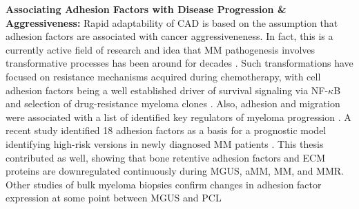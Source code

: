 










\textbf{Associating Adhesion Factors with Disease Progression \& Aggressiveness:}
Rapid adaptability of \ac{CAD} is based on the assumption that adhesion factors
are associated with cancer aggressiveneness. In fact, this is a currently active
field of research and idea that MM pathogenesis involves transformative
processes has been around for decades
\cite{hallekMultipleMyelomaIncreasing1998}. Such transformations have focused on
resistance mechanisms acquired during chemotherapy, with cell adhesion factors
being a well established driver of survival signaling via NF-$\kappa$B and
selection of drug-resistance myeloma clones
\cite{landowskiCellAdhesionmediatedDrug2003,
      solimandoDrugResistanceMultiple2022}. Also, adhesion and migration were
associated with a list of identified key regulators of myeloma
progression%
\cite{shenProgressionSignatureUnderlies2021}. A recent study identified 18
adhesion factors as a basis for a prognostic model identifying high-risk
versions in newly diagnosed MM patients
\cite{huDevelopmentCellAdhesionbased2024}. This thesis contributed as well,
showing that bone retentive adhesion factors and \ac{ECM} proteins are
downregulated continuously during \ac{MGUS}, \ac{aMM}, \ac{MM}, and \ac{MMR}.
Other studies of bulk myeloma biopsies confirm changes in adhesion factor
expression at some point between \ac{MGUS} and \ac{PCL}%
%
